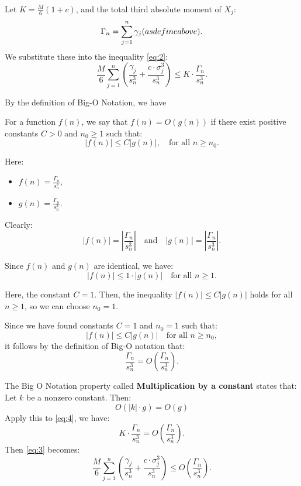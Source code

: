 \begin{itemize}
\begin{enumerate}
Let \( K = \frac{M}{6}(1 + c) \), and the total third absolute moment of \( X_j \):
\[
\Gamma_n = \sum_{j=1}^n \gamma_j ( \space as \space define \space above).
\]
We substitute these into the inequality \eqref{eq:2}:
\begin{equation} \label{eq:3}
\frac{M}{6} \sum_{j=1}^n \left( \frac{\gamma_j}{s_n^3} + \frac{c \cdot \sigma_j^3}{s_n^3} \right) \leq K \cdot \frac{\Gamma_n}{s_n^3}.
\end{equation}

By the definition of Big-O Notation, we have 
\begin{displayquote}
For a function \( f(n) \), we say that \( f(n) = O(g(n)) \) if there exist positive constants \( C > 0 \) and \( n_0 \geq 1 \) such that:
\[
|f(n)| \leq C |g(n)|, \quad \text{for all } n \geq n_0.
\]
\end{displayquote}

Here:
\begin{itemize}
    \item \( f(n) = \frac{\Gamma_n}{s_n^3} \),
    \item \( g(n) = \frac{\Gamma_n}{s_n^3} \).
\end{itemize}

Clearly:
\[
|f(n)| = \left| \frac{\Gamma_n}{s_n^3} \right| \quad \text{and} \quad |g(n)| = \left| \frac{\Gamma_n}{s_n^3} \right|.
\]

Since \( f(n) \) and \( g(n) \) are identical, we have:
\[
|f(n)| \leq 1 \cdot |g(n)| \quad \text{for all } n \geq 1.
\]


Here, the constant \( C = 1 \). Then, the inequality \( |f(n)| \leq C |g(n)| \) holds for all \( n \geq 1 \), so we can choose \( n_0 = 1 \).

Since we have found constants \( C = 1 \) and \( n_0 = 1 \) such that:
\[
|f(n)| \leq C |g(n)| \quad \text{for all } n \geq n_0,
\]
it follows by the definition of Big-O notation that:
\begin{equation} \label{eq:4}
\frac{\Gamma_n}{s_n^3} = O\left(\frac{\Gamma_n}{s_n^3}\right).
\end{equation}

The Big O Notation property called \textbf{Multiplication by a constant} states that:
Let \( k \) be a nonzero constant. Then:
\[
O(|k| \cdot g) = O(g)
\]
Apply this to \eqref{eq:4}, we have:
   \[
   K \cdot \frac{\Gamma_n}{s_n^3} = O\left(\frac{\Gamma_n}{s_n^3}\right).
   \]
Then \eqref{eq:3} becomes:
\[
\frac{M}{6} \sum_{j=1}^n \left( \frac{\gamma_j}{s_n^3} + \frac{c \cdot \sigma_j^3}{s_n^3} \right) \leq O\left(\frac{\Gamma_n}{s_n^3}\right).
\]


\end{enumerate}
\end{itemize}
